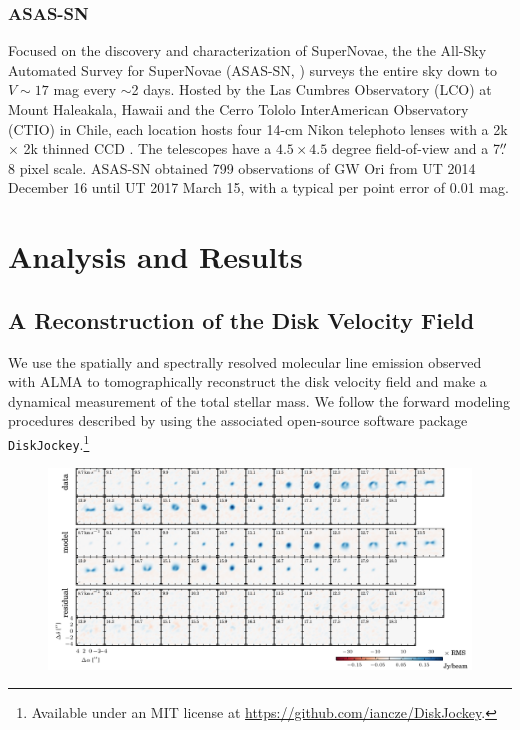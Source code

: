 \documentclass[twocolumn]{aastex61}
\begin{document}
\subsubsection{ASAS-SN}
Focused on the discovery and characterization of SuperNovae, the the All-Sky Automated Survey for SuperNovae (ASAS-SN, \citet{Shappee14}) surveys the entire sky down to $V \sim 17$ mag every $\sim$2 days. Hosted by the Las Cumbres Observatory (LCO) at Mount Haleakala, Hawaii and the Cerro Tololo InterAmerican Observatory (CTIO) in Chile, each location hosts four 14-cm Nikon telephoto lenses with a 2k $\times$ 2k thinned CCD \citep{Brown13}. The telescopes have a $4.5\times4.5$ degree field-of-view and a 7$\mbox{$.\!\!^{\prime\prime}$}$8 pixel scale. ASAS-SN obtained 799 observations of GW Ori from UT 2014 December 16 until UT 2017 March 15, with a typical per point error of 0.01 mag.


\section{Analysis and Results}

\subsection{A Reconstruction of the Disk Velocity Field}
\label{sec:disk}
We use the spatially and spectrally resolved molecular line emission observed with ALMA to tomographically reconstruct the disk velocity field and make a dynamical measurement of the total stellar mass. We follow the forward modeling procedures described by \citet{czekala15a,czekala16} using the associated open-source software package {\tt DiskJockey}.\footnote{Available under an MIT license at \url{https://github.com/iancze/DiskJockey}.}

\begin{figure}[ht!]
\begin{center}
  \includegraphics{chmaps_13CO.pdf}
  \end{center}
\end{figure}
\end{document}
